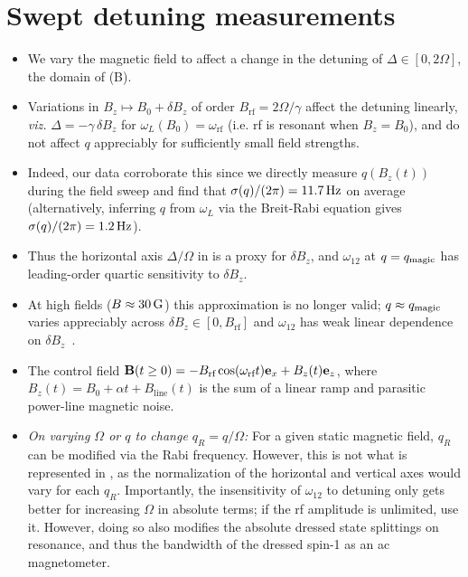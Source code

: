 \documentclass[aps,prl,reprint,superscriptaddress,floatfix]{revtex4-1}
\begin{document}
\section{Swept detuning measurements}
\label{sec:swept_detuning}
\begin{itemize}
    \item We vary the magnetic field to affect a change in the detuning of $\Delta \in [0, 2\Omega]$, the domain of (B).
    \item Variations in $B_z \mapsto B_0 + \delta B_z$ of order $B_{\text{rf}} = 2\Omega/\gamma$ affect the detuning linearly, \textit{viz.} $\Delta = - \gamma \, \delta B_z$ for $\omega_L(B_0) = \omega_{\text{rf}}$ (i.e. rf is resonant when $B_z=B_0$), and do not affect $q$ appreciably for sufficiently small field strengths.
    \item Indeed, our data corroborate this since we directly measure $q(B_z(t))$ during the field sweep and find that $\sigma(q)/(2\pi) = \unit[11.7]{Hz}$ on average (alternatively, inferring $q$ from $\omega_L$ via the Breit-Rabi equation gives $\sigma(q)/(2\pi) = \unit[1.2]{Hz}$).
    \item Thus the horizontal axis $\Delta/\Omega$ in  is a proxy for $\delta B_z$, and $\omega_{12}$ at $q=q_{\text{magic}}$ has leading-order quartic sensitivity to $\delta B_z$.
        \item At high fields ($B\approx \unit[30]{G}$) this approximation is no longer valid; $q \approx q_{\text{magic}}$ varies appreciably across $\delta B_z \in [0, B_{\text{rf}}]$ and $\omega_{12}$ has weak linear dependence on $\delta B_z$~\cite{dimitris_synthetic_2017}.
    \item[\checkmark]  The control field $\mathbf{B}(t \geq 0) = -B_{\text{rf}} \cos (\omega_{\text{rf}} t) \mathbf{e}_x + B_z(t) \mathbf{e}_z$, where $B_z(t) = B_0 + \alpha t + B_{\text{line}}(t)$ is the sum of a linear ramp and parasitic power-line magnetic noise.
    \item[\checkmark] \textit{On varying $\Omega$ or $q$ to change $q_R=q/\Omega$:}
    For a given static magnetic field, $q_R$ can be modified via the Rabi frequency.
    However, this is not what is represented in , as the normalization of the horizontal and vertical axes would vary for each $q_R$.
    Importantly, the insensitivity of $\omega_{12}$ to detuning only gets better for increasing $\Omega$ in absolute terms; if the rf amplitude is unlimited, use it.
    However, doing so also modifies the absolute dressed state splittings on resonance, and thus the bandwidth of the dressed spin-1 as an ac magnetometer.

\end{itemize}
\end{document}
